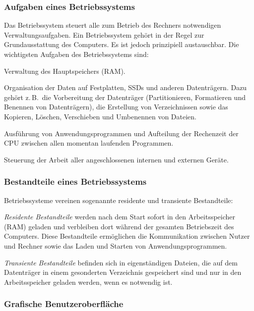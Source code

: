 \subsubsection{Aufgaben eines Betriebssystems}

Das Betriebssystem steuert alle zum Betrieb des Rechners notwendigen
Verwaltungsaufgaben. Ein Betriebssystem gehört in der Regel zur
Grundausstattung des Computers. Es ist jedoch prinzipiell austauschbar. Die
wichtigsten Aufgaben des Betriebssystems sind:

\begin{compactitem}
\item[\textbf{Speicherverwaltung}]
Verwaltung des Hauptspeichers (RAM).
\item[\textbf{Dateiverwaltung}]
Organisation der Daten auf Festplatten, SSDs und anderen Datenträgern. Dazu
gehört z.\,B.\ die Vorbereitung der Datenträger (Partitionieren, Formatieren und
Benennen von Datenträgern), die Erstellung von Verzeichnissen sowie das
Kopieren, Löschen, Verschieben und Umbenennen von Dateien.
\item[\textbf{Programmverwaltung} (Fachwort: \emph{Prozessverwaltung})]
Ausführung von Anwendungsprogrammen und Aufteilung der Rechenzeit der CPU
zwischen allen momentan laufenden Programmen.
\item[\textbf{Geräteverwaltung}]
Steuerung der Arbeit aller angeschlossenen internen und externen Geräte.
\end{compactitem}

\subsubsection{Bestandteile eines Betriebssystems}

Betriebssysteme vereinen sogenannte residente und transiente Bestandteile:

\emph{Residente Bestandteile} werden nach dem Start sofort in den
Arbeitsspeicher (RAM) geladen und verbleiben dort während der gesamten
Betriebszeit des Computers. Diese Bestandteile ermöglichen die Kommunikation
zwischen Nutzer und Rechner sowie das Laden und Starten von
Anwendungsprogrammen.

\emph{Transiente Bestandteile} befinden sich in eigenständigen Dateien, die auf
dem Datenträger in einem gesonderten Verzeichnis gespeichert sind und nur in
den Arbeitsspeicher geladen werden, wenn es notwendig ist.

\subsubsection{Grafische Benutzeroberfläche}

